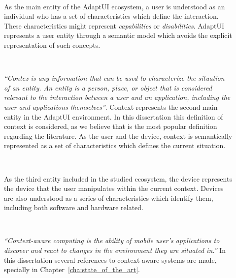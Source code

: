 \begin{description}
  \item[] \hfill \\
  \begin{mdframed}[hidealllines=true,backgroundcolor=gray!20]
  As the main entity of the AdaptUI ecosystem, a user is understood as an individual
  who has a set of characteristics which define the interaction. These characteristics 
  might represent \textit{capabilities} or \textit{disabilities}. AdaptUI represents 
  a user entity through a semantic model which avoids the explicit representation 
  of such concepts. 
  \end{mdframed}

  \item[] \hfill \\
  \begin{mdframed}[hidealllines=true,backgroundcolor=gray!20]
  \textit{``Contex is any information that can be used to characterize the 
  situation of an entity. An entity is a person, place, or object that is 
  considered relevant to the interaction between a user and an application, 
  including the user and applications themselves''}. Context represents the 
  second main entity in the AdaptUI environment. In this dissertation this 
  definition of context is considered, as we believe that is the most popular 
  definition regarding the literature. As the user and the device, context is 
  semantically represented as a set of characteristics which defines the current 
  situation.
  \end{mdframed}
  
  \item[] \hfill \\
  \begin{mdframed}[hidealllines=true,backgroundcolor=gray!20]
  As the third entity included in the studied ecosystem, the device represents 
  the device that the user manipulates within the current context. Devices are
  also understood as a series of characteristics which identify them, including
  both software and hardware related.
  \end{mdframed}
  
  \item[] \hfill \\
  \begin{mdframed}[hidealllines=true,backgroundcolor=gray!20]
  \textit{``Context-aware computing is the ability of mobile user's applications 
  to discover and react to changes in the environment they are situated in.''} 
  In this dissertation several references to context-aware systems are made, 
  specially in Chapter~\ref{cha:state_of_the_art}.
  \end{mdframed}
  

\end{description}
